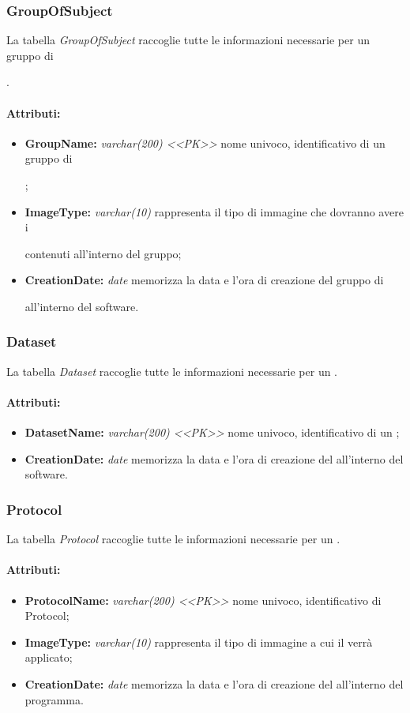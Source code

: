 \subsubsection{GroupOfSubject}
\label{DBGro}
La tabella \textit{GroupOfSubject} raccoglie tutte le informazioni necessarie per un gruppo di \subject{}.
\paragraph{Attributi:}
\begin{itemize}
\item \textbf{GroupName:} \emph{varchar(200) <<PK>>} nome univoco, identificativo di un gruppo di \subject{};
\item \textbf{ImageType:} \emph{varchar(10)} rappresenta il tipo di immagine che dovranno avere i \subject{} contenuti all'interno del gruppo;
\item \textbf{CreationDate:} \emph{date} memorizza la data e l'ora di creazione del gruppo di \subject{} all'interno del software.
\end{itemize}

\subsubsection{Dataset}
\label{DBData}
La tabella \textit{Dataset} raccoglie tutte le informazioni necessarie per un \dataset{}.
\paragraph{Attributi:}
\begin{itemize}
\item \textbf{DatasetName:} \emph{varchar(200) <<PK>>} nome univoco, identificativo di un \dataset{};
\item \textbf{CreationDate:} \emph{date} memorizza la data e l'ora di creazione del \dataset{} all'interno del software.
\end{itemize}

\subsubsection{Protocol}
\label{DBPro}
La tabella \textit{Protocol} raccoglie tutte le informazioni necessarie per un \protocol{}.
\paragraph{Attributi:}
\begin{itemize}
\item \textbf{ProtocolName:} \emph{varchar(200) <<PK>>} nome univoco, identificativo di Protocol\glossario{};
\item \textbf{ImageType:} \emph{varchar(10)} rappresenta il tipo di immagine a cui il \protocol{} verrà applicato;
\item \textbf{CreationDate:} \emph{date} memorizza la data e l'ora di creazione del \protocol{} all'interno del programma.
\end{itemize}

